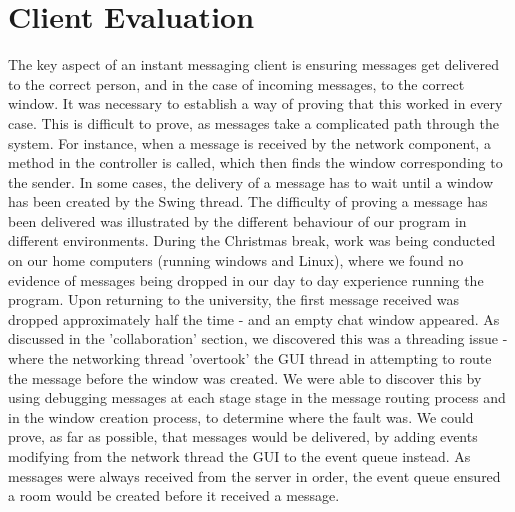 \section{Client Evaluation}
\label{client_eval}

The key aspect of an instant messaging client is ensuring messages get delivered to the correct person, and in the case of incoming messages, to the correct window. It was necessary to establish a way of proving that this worked in every case. This is difficult to prove, as messages take a complicated path through the system. For instance, when a message is received by the network component, a method in the controller is called, which then finds the window corresponding to the sender. In some cases, the delivery of a message has to wait until a window has been created by the Swing thread. The difficulty of proving a message has been delivered was illustrated by the different behaviour of our program in different environments. During the Christmas break, work was being conducted on our home computers (running windows and Linux), where we found no evidence of messages being dropped in our day to day experience running the program. Upon returning to the university, the first message received was dropped approximately half the time - and an empty chat window appeared. As discussed in the 'collaboration' section, we discovered this was a threading issue - where the networking thread 'overtook' the GUI thread in attempting to route the message before the window was created. We were able to discover this by using debugging messages at each stage stage in the message routing process and in the window creation process, to determine where the fault was. We could prove, as far as possible, that messages would be delivered, by adding events modifying from the network thread the GUI to the event queue instead. As messages were always received from the server in order, the event queue ensured a room would be created before it received a message. 





